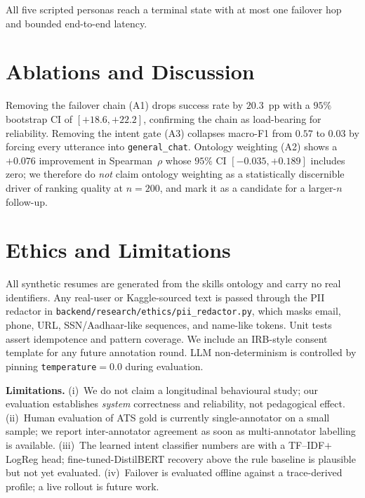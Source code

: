 \documentclass[conference]{IEEEtran}
\begin{document}
All five scripted personas reach a terminal state with at most one
failover hop and bounded end-to-end latency.

\section{Ablations and Discussion}\label{sec:ablations}



Removing the failover chain (A1) drops success rate by $20.3$~pp with a
$95\%$ bootstrap CI of $[+18.6, +22.2]$, confirming the chain as
load-bearing for reliability. Removing the intent gate (A3) collapses
macro-F1 from $0.57$ to $0.03$ by forcing every utterance into
\texttt{general\_chat}. Ontology weighting (A2) shows a
$+0.076$ improvement in Spearman~$\rho$ whose $95\%$ CI
$[-0.035,+0.189]$ includes zero; we therefore do \emph{not} claim
ontology weighting as a statistically discernible driver of ranking
quality at $n=200$, and mark it as a candidate for a larger-$n$
follow-up.

\section{Ethics and Limitations}\label{sec:ethics}

All synthetic resumes are generated from the skills ontology and carry
no real identifiers. Any real-user or Kaggle-sourced text is passed
through the PII redactor in
\texttt{backend/research/ethics/pii\_redactor.py}, which masks email,
phone, URL, SSN/Aadhaar-like sequences, and name-like tokens. Unit
tests assert idempotence and pattern coverage. We include an IRB-style
consent template for any future annotation round. LLM non-determinism
is controlled by pinning \texttt{temperature}$=0.0$ during evaluation.

\noindent\textbf{Limitations.} (i)~We do not claim a longitudinal
behavioural study; our evaluation establishes \emph{system} correctness
and reliability, not pedagogical effect. (ii)~Human evaluation of
ATS gold is currently single-annotator on a small sample; we report
inter-annotator agreement as soon as multi-annotator labelling is
available. (iii)~The learned intent classifier numbers are with a
TF--IDF$+$LogReg head; fine-tuned-DistilBERT recovery above the rule
baseline is plausible but not yet evaluated. (iv)~Failover is evaluated
offline against a trace-derived profile; a live rollout is future
work.
\end{document}
